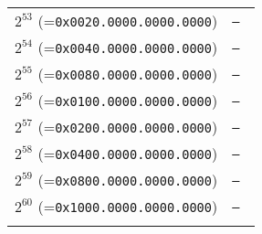 \documentclass[documentation]{subfiles}
\begin{document}
\begin{minipage}{0.49\textwidth}
\begin{longtable}{rl}
        $2^{53}$ (={\tt 0x0020.0000.0000.0000}) & {\tt --      }\\
        $2^{54}$ (={\tt 0x0040.0000.0000.0000}) & {\tt --      }\\
        $2^{55}$ (={\tt 0x0080.0000.0000.0000}) & {\tt --      }\\
        $2^{56}$ (={\tt 0x0100.0000.0000.0000}) & {\tt --      }\\
        $2^{57}$ (={\tt 0x0200.0000.0000.0000}) & {\tt --      }\\
        $2^{58}$ (={\tt 0x0400.0000.0000.0000}) & {\tt --      }\\
        $2^{59}$ (={\tt 0x0800.0000.0000.0000}) & {\tt --      }\\
        $2^{60}$ (={\tt 0x1000.0000.0000.0000}) & {\tt --      }\\
        \\
        \bottomrule
    \end{longtable}
\end{minipage}

\end{document}
